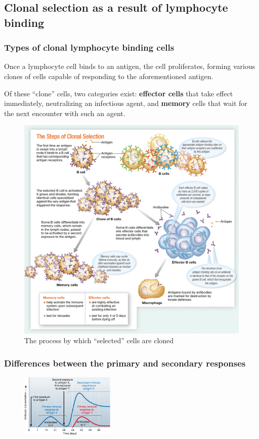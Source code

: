 \documentclass{article}
\begin{document}
\subsection{Clonal selection as a result of lymphocyte binding}

\subsubsection{Types of clonal lymphocyte binding cells}

Once a lymphocyte cell binds to an antigen, the cell proliferates, forming
various clones of cells capable of responding to the aforementioned antigen.

Of these ``clone'' cells, two categories exist: \textbf{effector cells} that
take effect immediately, neutralizing an infectious agent, and \textbf{memory}
cells that wait for the next encounter with such an agent.

\begin{figure}[h]
	\centering
	\includegraphics[width=12cm]{lymphocyte_clone_cells.png}
	\caption{The process by which ``selected'' cells are cloned}
\end{figure}

\subsubsection{Differences between the primary and secondary responses}

\begin{figure}
	\centering
	\includegraphics[width=0.4\textwidth]{primary_vs_secondary_response_graph.png}
\end{figure}
\end{document}
